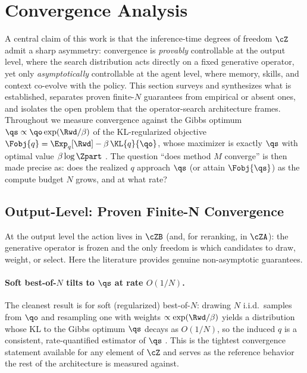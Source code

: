 \section{Convergence Analysis}
\label{sec:convergence}

A central claim of this work is that the inference-time degrees of freedom $\cZ$ admit a sharp asymmetry: convergence is \emph{provably} controllable at the output level, where the search distribution acts directly on a fixed generative operator, yet only \emph{asymptotically} controllable at the agent level, where memory, skills, and context co-evolve with the policy. This section surveys and synthesizes what is established, separates proven finite-$N$ guarantees from empirical or absent ones, and isolates the open problem that the operator-search architecture frames. Throughout we measure convergence against the Gibbs optimum $\qs \propto \qo \exp(\Rwd/\beta)$ of the KL-regularized objective $\Fobj{q} = \Exp_{q}[\Rwd] - \beta\,\KL{q}{\qo}$, whose maximizer is exactly $\qs$ with optimal value $\beta \log \Zpart$ \citep{korbak2022kl}. The question ``does method $M$ converge'' is then made precise as: does the realized $q$ approach $\qs$ (or attain $\Fobj{\qs}$) as the compute budget $N$ grows, and at what rate?

\subsection{Output-Level: Proven Finite-N Convergence}
\label{subsec:output-level}

At the output level the action lives in $\cZB$ (and, for reranking, in $\cZA$): the generative operator is frozen and the only freedom is which candidates to draw, weight, or select. Here the literature provides genuine non-asymptotic guarantees.

\paragraph{Soft best-of-$N$ tilts to $\qs$ at rate $O(1/N)$.} The cleanest result is for soft (regularized) best-of-$N$: drawing $N$ i.i.d.\ samples from $\qo$ and resampling one with weights $\propto \exp(\Rwd/\beta)$ yields a distribution whose KL to the Gibbs optimum $\qs$ decays as $O(1/N)$, so the induced $q$ is a consistent, rate-quantified estimator of $\qs$ \citep{verdun2025softbon}. This is the tightest convergence statement available for any element of $\cZ$ and serves as the reference behavior the rest of the architecture is measured against.

